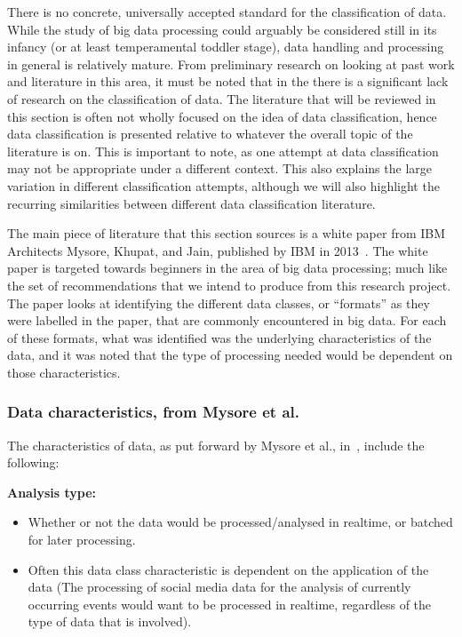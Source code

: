 \documentclass[a4paper,11pt]{article}
\begin{document}
There is no concrete, universally accepted standard for the classification of data. While the study of big data processing
could arguably be considered still in its infancy (or at least temperamental toddler stage), data handling and processing
in general is relatively mature. From preliminary research on looking at past work and literature in this area,
it must be noted that in the there is a significant lack of research on the classification of data. The literature that
will be reviewed in this section is often not wholly focused on the idea of data classification, hence data classification
is presented relative to whatever the overall topic of the literature is on. This is important to note, as one attempt
at data classification may not be appropriate under a different context. This also explains the large variation in different
classification attempts, although we will also highlight the recurring similarities between different data classification
literature.

The main piece of literature that this section sources is a white paper from IBM Architects Mysore, Khupat, and Jain,
published by IBM in 2013~\cite{ibm_big_2013}. The white paper is targeted towards beginners in the area of big data
processing; much like the set of recommendations that we intend to produce from this research project. The paper looks
at identifying the different data classes, or ``formats'' as they were labelled in the paper, that are commonly
encountered in big data. For each of these formats, what was identified was the underlying characteristics of the data,
and it was noted that the type of processing needed would be dependent on those characteristics.


\subsubsection{Data characteristics, from Mysore et al.} %
\label{ssub:data_charact}

The characteristics of data, as put forward by Mysore et al., in~\cite{ibm_big_2013}, include the following:
\par
\textbf{Analysis type:}

\begin{itemize}
  \item Whether or not the data would be processed/analysed in realtime, or batched for later processing.
  \item Often this data class characteristic is dependent on the application of the data (\eg{}The processing of social
  media data for the analysis of currently occurring events would want to be processed in realtime, regardless of the
  type of data that is involved).
\end{itemize}
\end{document}

